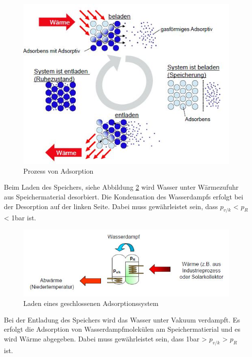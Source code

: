 \documentclass[11pt,a4paper]{scrartcl}
\begin{document}
\begin{figure}[h!]
\begin{center}
\includegraphics[scale=0.6]{images/prozess.jpg}
\caption{Prozess von Adsorption \cite{zeosys}}
\label{fig:adsorption}
\end{center}
\end{figure}

Beim Laden des Speichers, siehe Abbildung \ref{fig:geschlossenerladen} wird
Wasser unter Wärmezufuhr aus Speichermaterial desorbiert. Die Kondensation des
Wasserdampfs erfolgt bei der Desorption auf der linken Seite.
Dabei muss gewährleistet sein, dass $p_{v/k}$ < $p_R$ < 1bar ist.

\begin{figure}[h!]
\begin{center}
\includegraphics[scale=0.6]{images/geschlossenerladen.jpg}
\caption{Laden eines geschlossenen Adsorptionssystem \cite{zeosys}}
\label{fig:geschlossenerladen}
\end{center}
\end{figure}

Bei der Entladung des Speichers wird das Wasser unter Vakuum verdampft. Es
erfolgt die Adsorption von Wasserdampfmolekülen am Speichermatierial und es
wird Wärme abgegeben. Dabei muss gewährleistet sein, dass 1bar > $p_{v/k}$ >
$p_R$ ist.
\end{document}
